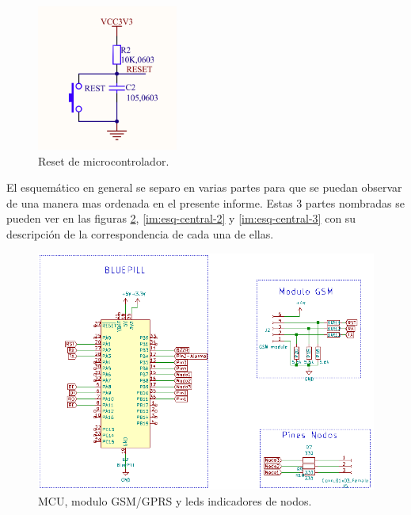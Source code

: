 \begin{figure}[!h]
	\centering
	\includegraphics[scale=0.6]{images/central/bluepill-reset.png}
    \caption{Reset de microcontrolador.}
	\label{im:reset-bluepill}
\end{figure}

\par El esquemático en general se separo en varias partes para que se puedan observar de una manera 
mas ordenada en el presente informe. Estas 3 partes nombradas se pueden ver en las figuras 
\ref{im:esq-central-1}, \ref{im:esq-central-2} y \ref{im:esq-central-3} con su descripción de la 
correspondencia de cada una de ellas. 

\begin{figure}[!h]
	\centering
	\includegraphics[scale=.50]{images/central/central-esq-1.png}
    \caption{MCU, modulo GSM/GPRS y leds indicadores de nodos.}
	\label{im:esq-central-1}
\end{figure}


